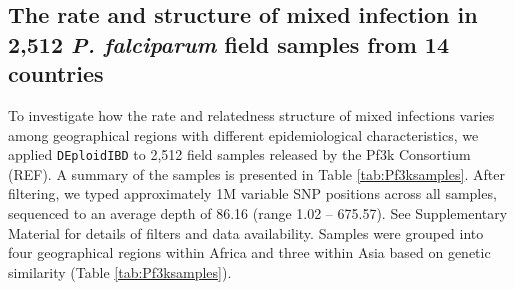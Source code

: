 \documentclass[9pt,lineno]{elife}
\begin{document}
\subsection{The rate and structure of mixed infection in 2,512 {\it P. falciparum} field samples from 14 countries}

To investigate how the rate and relatedness structure of mixed infections varies among geographical regions with different epidemiological characteristics, we applied \texttt{DEploidIBD} to 2,512 field samples released by the Pf3k Consortium (REF).  A summary of the samples is presented in Table \ref{tab:Pf3ksamples}.  After filtering, we typed approximately 1M variable SNP positions across all samples, sequenced to an average depth of 86.16 (range 1.02 – 675.57).  See Supplementary Material for details of filters and data availability.  Samples were grouped into four geographical regions within Africa and three within Asia based on genetic similarity (Table \ref{tab:Pf3ksamples}).
\end{document}

